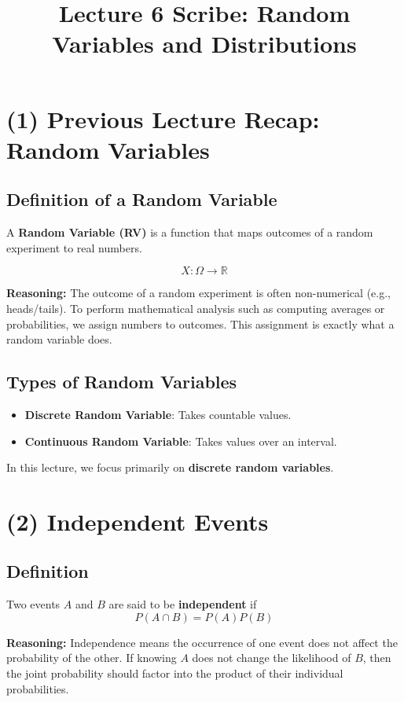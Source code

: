 \documentclass[11pt]{article}
\title{\textbf{Lecture 6 Scribe: Random Variables and Distributions}}
\author{}
\date{}
\begin{document}
\maketitle

\section*{(1) Previous Lecture Recap: Random Variables}

\subsection*{Definition of a Random Variable}
A \textbf{Random Variable (RV)} is a function that maps outcomes of a random experiment to real numbers.

\[
X: \Omega \rightarrow \mathbb{R}
\]

\textbf{Reasoning:}  
The outcome of a random experiment is often non-numerical (e.g., heads/tails). To perform mathematical analysis such as computing averages or probabilities, we assign numbers to outcomes. This assignment is exactly what a random variable does.

\subsection*{Types of Random Variables}
\begin{itemize}
    \item \textbf{Discrete Random Variable}: Takes countable values.
    \item \textbf{Continuous Random Variable}: Takes values over an interval.
\end{itemize}

In this lecture, we focus primarily on \textbf{discrete random variables}.

\section*{(2) Independent Events}

\subsection*{Definition}
Two events $A$ and $B$ are said to be \textbf{independent} if
\[
P(A \cap B) = P(A)P(B)
\]

\textbf{Reasoning:}  
Independence means the occurrence of one event does not affect the probability of the other. If knowing $A$ does not change the likelihood of $B$, then the joint probability should factor into the product of their individual probabilities.
\end{document}
